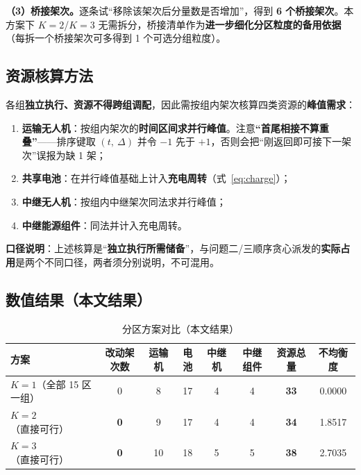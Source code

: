 \textbf{（3）桥接架次。}逐条试“移除该架次后分量数是否增加”，得到 \textbf{6 个桥接架次}。本方案下 $K=2$/$K=3$ 无需拆分，桥接清单作为\textbf{进一步细化分区粒度的备用依据}（每拆一个桥接架次可多得到 1 个可选分组粒度）。

\subsection{资源核算方法}

各组\textbf{独立执行、资源不得跨组调配}，因此需按组内架次核算四类资源的\textbf{峰值需求}：

\begin{enumerate}[label=(\arabic*),leftmargin=2em]
	\item \textbf{运输无人机}：按组内架次的\textbf{时间区间求并行峰值}。注意\textbf{“首尾相接不算重叠”}——排序键取 $(t,\ \Delta)$ 并令 $-1$ 先于 $+1$，否则会把“刚返回即可接下一架次”误报为缺 1 架；
	\item \textbf{共享电池}：在并行峰值基础上计入\textbf{充电周转}（式~\eqref{eq:charge}）；
	\item \textbf{中继无人机}：按组内中继架次同法求并行峰值；
	\item \textbf{中继能源组件}：同法并计入充电周转。
\end{enumerate}

\textbf{口径说明}：上述核算是“\textbf{独立执行所需储备}”，与问题二/三顺序贪心派发的\textbf{实际占用}是两个不同口径，两者须分别说明，不可混用。

\subsection{数值结果（本文结果）}

\begin{table}[htbp]
	\caption{分区方案对比（本文结果）}
	\label{tab:q4compare}
	\centering
	\begin{tabular}{lccccccc}
		\toprule
		方案 & 改动架次数 & 运输机 & 电池 & 中继机 & 中继组件 & 资源总量 & 不均衡度 \\
		\midrule
		$K=1$（全部 15 区一组） & 0 & 8  & 17 & 4 & 4 & \textbf{33} & 0.0000 \\
		$K=2$（直接可行）      & \textbf{0} & 9  & 17 & 4 & 4 & \textbf{34} & 1.8517 \\
		$K=3$（直接可行）      & \textbf{0} & 10 & 18 & 5 & 5 & \textbf{38} & 2.7035 \\
		\bottomrule
	\end{tabular}
\end{table}

